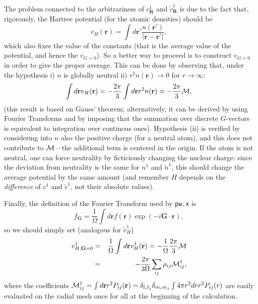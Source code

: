 \documentclass[a4paper,twocolumn,12pt]{article}
\newcommand{\var}[1]{{\tt #1}}
\begin{document}
{The problem connected to the arbitrariness of $c^1_{\mathbf{R}}$ and
$\tilde{c}^1_{\mathbf{R}}$ is due to the fact that, rigorously, the
Hartree potential (for the atomic densities) should be
\begin{equation}
v_H({\mathbf{r}})=\int{d{\mathbf{r}}'\frac{n({\mathbf{r}}')}{|{\mathbf{r}}-{\mathbf{r}}'|}},
\end{equation}
which also fixes the value of the constants (that is the average value
of the potential, and hence the $v_{G=0}$).  So a better way to
proceed is to construct $v_{G=0}$ in order to give the proper average.
This can be done by observing that, under the hypothesis i) $n$ is
globally neutral ii) $r^2n({\mathbf{r}})\rightarrow0$ for
$r\rightarrow\infty$:
\begin{equation}
\int{d{\mathbf{r}}v_H({\mathbf{r}})}=-\frac{2\pi}{3}\int{d{\mathbf{r}}r^2n({\mathbf{r}})}\equiv-\frac{2\pi}{3}{\cal{M}},
\end{equation}
(this result is based on Gauss' theorem; alternatively, it can be
derived by using Fourier Transforms and by imposing that the summation
over discrete $G$-vectors is equivalent to integration over continous
ones).  Hypothesis (ii) is verified by considering into $n$ also the
positive charge (for a neutral atom), and this does not contribute to
${\cal{M}}$---the additional term is centered in the origin.  If the
atom is not neutral, one can force neutrality by ficticiously changing
the nuclear charge: since the deviation from neutrality is the same
for $n^1$ and $\tilde{n}^1$, this should change the average potential
by the same amount (and remember $H$ depends on the {\em difference}
of $c^1$ and $\tilde{c}^1$, not their absolute values).


Finally, the definition of the Fourier Transform used by \var{pw.x} is
\begin{equation}
f_{\mathbf{G}}=\frac{1}{\Omega}\int{d{\mathbf{r}} f({\mathbf{r}})
\exp(-i{\mathbf{G}}\cdot{\mathbf{r}})},
\end{equation}
so we should simply set (analogous for $\tilde{v}^1_H$)
\begin{eqnarray}
v^1_{H,{\mathbf{G}}=0}&=&\frac{1}{\Omega}\int{d{\mathbf{r}}v^1_H({\mathbf{r}})}=-\frac{1}{\Omega}\frac{2\pi}{3}{\cal{M}}
\nonumber\\&=&-\frac{2\pi}{3\Omega}\sum_{ij}\rho_{ij}{\cal{M}}^1_{ij},
\end{eqnarray}
where the coefficients
${\cal{M}}^1_{ij}=\int{d{\mathbf{r}}r^2P_{ij}({\mathbf{r}})}
=\delta_{l_il_j}\delta_{m_im_j}\int{4{\pi}r^2drr^2P_{ij}(r)}$ are
easily evaluated on the radial mesh once for all at the beginning of
the calculation.
}
\end{document}
